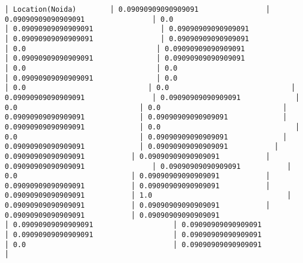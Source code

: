 \documentclass[11pt]{article}
\begin{document}
\begin{Verbatim}[commandchars=\\\{\}]
│ Location(Noida)        │ 0.09090909090909091                │ 0.09090909090909091                │ 0.0                                │ 0.09090909090909091                │ 0.09090909090909091                │ 0.09090909090909091                │ 0.09090909090909091                │ 0.0                               │ 0.09090909090909091               │ 0.09090909090909091               │ 0.09090909090909091                │ 0.0                               │ 0.0                               │ 0.09090909090909091               │ 0.0                             │ 0.0                             │ 0.0                             │ 0.09090909090909091                │ 0.09090909090909091             │ 0.0                             │ 0.0                             │ 0.09090909090909091             │ 0.09090909090909091             │ 0.09090909090909091             │ 0.0                                │ 0.0                             │ 0.09090909090909091             │ 0.09090909090909091             │ 0.09090909090909091           │ 0.09090909090909091           │ 0.09090909090909091           │ 0.09090909090909091                │ 0.09090909090909091           │ 0.0                           │ 0.09090909090909091           │ 0.09090909090909091           │ 0.09090909090909091           │ 0.09090909090909091           │ 1.0                                │ 0.09090909090909091           │ 0.09090909090909091           │ 0.09090909090909091           │ 0.09090909090909091                   │ 0.09090909090909091                   │ 0.09090909090909091                   │ 0.09090909090909091                   │ 0.09090909090909091                   │ 0.0                                   │ 0.09090909090909091                   │

\end{Verbatim}
\end{document}
